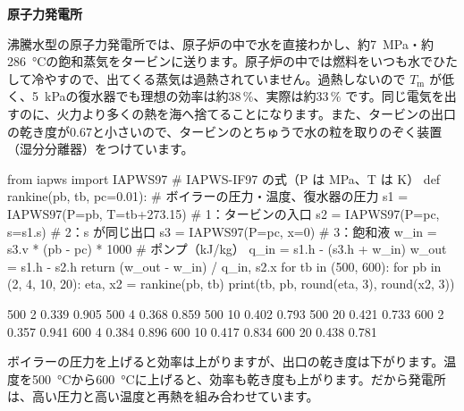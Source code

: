 \noindent\textbf{原子力発電所}\par\nobreak
沸騰水型の原子力発電所では、原子炉の中で水を直接わかし、約\qty{7}{MPa}・約\qty{286}{\celsius}の飽和蒸気をタービンに送ります。原子炉の中では燃料をいつも水でひたして冷やすので、出てくる蒸気は過熱されていません。過熱しないので $T_{\mathrm m}$ が低く、\qty{5}{kPa}の復水器でも理想の効率は約38\,\%、実際は約33\,\% です。同じ電気を出すのに、火力より多くの熱を海へ捨てることになります。また、タービンの出口の乾き度が0.67と小さいので、タービンのとちゅうで水の粒を取りのぞく装置（湿分分離器）をつけています。

\begin{phcode}[Python]
from iapws import IAPWS97          \# IAPWS-IF97 の式（P は MPa、T は K）
def rankine(pb, tb, pc=0.01):      \# ボイラーの圧力・温度、復水器の圧力
    s1 = IAPWS97(P=pb, T=tb+273.15)          \# 1：タービンの入口
    s2 = IAPWS97(P=pc, s=s1.s)               \# 2：s が同じ出口
    s3 = IAPWS97(P=pc, x=0)                  \# 3：飽和液
    w\_in = s3.v * (pb - pc) * 1000          \# ポンプ（kJ/kg）
    q\_in = s1.h - (s3.h + w\_in)
    w\_out = s1.h - s2.h
    return (w\_out - w\_in) / q\_in, s2.x
for tb in (500, 600):
    for pb in (2, 4, 10, 20):
        eta, x2 = rankine(pb, tb)
        print(tb, pb, round(eta, 3), round(x2, 3))
\end{phcode}
\begin{phcodeout}
500 2 0.339 0.905
500 4 0.368 0.859
500 10 0.402 0.793
500 20 0.421 0.733
600 2 0.357 0.941
600 4 0.384 0.896
600 10 0.417 0.834
600 20 0.438 0.781
\end{phcodeout}
\noindent ボイラーの圧力を上げると効率は上がりますが、出口の乾き度は下がります。温度を\qty{500}{\celsius}から\qty{600}{\celsius}に上げると、効率も乾き度も上がります。だから発電所は、高い圧力と高い温度と再熱を組み合わせています。
\begin{bkfigure}
\label{ph:熱-8:fig-sim}
\end{bkfigure}


